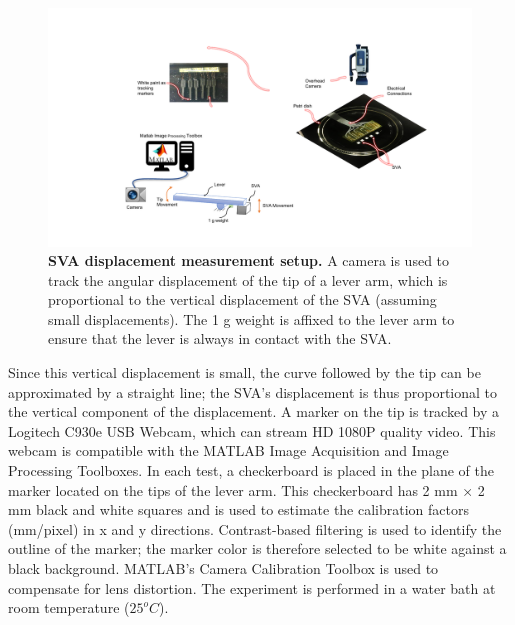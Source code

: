 \begin{figure}[!h]
      \centering
      \includegraphics[width=\textwidth]{swellingTestSetup.pdf}
      \caption[]{\textbf{SVA displacement measurement setup.} A camera is used to track the angular displacement of the tip of a lever arm, which is proportional to the vertical displacement of the SVA (assuming small displacements). The 1 g weight is affixed to the lever arm to ensure that the lever is always in contact with the SVA.}
      \label{fig:swellingTestSetup}
\end{figure}

Since this vertical displacement is small, the curve followed by the tip can be approximated by a straight line; the SVA's displacement is thus proportional to the vertical component of the displacement. A marker on the tip is tracked by a Logitech C930e USB Webcam, which can stream HD 1080P quality video. This webcam is compatible with the MATLAB Image Acquisition and Image Processing Toolboxes. In each test, a checkerboard is placed in the plane of the marker located on the tips of the lever arm. This checkerboard has 2 mm × 2 mm black and white squares and is used to estimate the calibration factors (mm/pixel) in x and y directions. Contrast-based filtering is used to identify the outline of the marker; the marker color is therefore selected to be white against a black background. MATLAB’s Camera Calibration Toolbox is used to compensate for lens distortion. The experiment is performed in a water bath at room temperature ($25^{o}C$).


